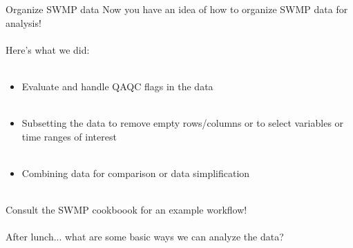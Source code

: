\documentclass[xcolor=svgnames]{beamer}\usepackage[]{graphicx}\usepackage[]{color}
\newcommand{\Bigtxt}[1]{\textbf{\textit{#1}}}
\begin{document}
\begin{frame}[containsverbatim]{Organize SWMP data}
Now you have an idea of how to organize SWMP data for analysis!\\~\\
Here's what we did:\\~\\
\begin{itemize}
\item Evaluate and \alert{handle QAQC} flags in the data \\~\\
\item \alert{Subsetting} the data to remove empty rows/columns or to select variables or time ranges of interest \\~\\
\item \alert{Combining} data for comparison or data simplification \\~\\
\end{itemize}
Consult the SWMP cookboook for an example workflow! \\~\\
After lunch... what are some basic ways we can analyze the data?
\end{frame}

\end{document}
